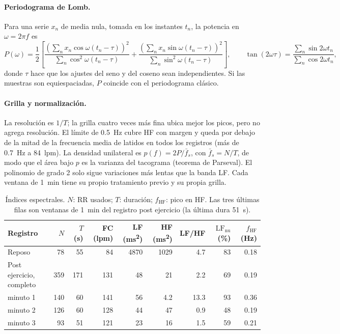 \paragraph{Periodograma de Lomb.}
Para una serie $x_n$ de media nula, tomada en los instantes $t_n$, la potencia en $\omega = 2\pi f$ es
\begin{equation}
  P(\omega) = \frac{1}{2}\left[
    \frac{\left(\sum_n x_n \cos\omega(t_n-\tau)\right)^2}{\sum_n \cos^2\omega(t_n-\tau)} +
    \frac{\left(\sum_n x_n \sin\omega(t_n-\tau)\right)^2}{\sum_n \sin^2\omega(t_n-\tau)}
  \right],
  \qquad
  \tan(2\omega\tau) = \frac{\sum_n \sin 2\omega t_n}{\sum_n \cos 2\omega t_n},
  \label{eq:lomb}
\end{equation}
donde $\tau$ hace que los ajustes del seno y del coseno sean independientes. Si las muestras son equiespaciadas, $P$ coincide con el periodograma clásico.

\paragraph{Grilla y normalización.}
La resolución es $1/T$; la grilla cuatro veces más fina ubica mejor los picos, pero no agrega resolución. El límite de \SI{0.5}{\hertz} cubre HF con margen y queda por debajo de la mitad de la frecuencia media de latidos en todos los registros (más de \SI{0.7}{\hertz} a \SI{84}{lpm}). La densidad unilateral es $p(f) = 2P/\bar f_s$, con $\bar f_s = N/T$, de modo que el área bajo $p$ es la varianza del tacograma (teorema de Parseval). El polinomio de grado 2 solo sigue variaciones más lentas que la banda LF. Cada ventana de \SI{1}{\minute} tiene su propio tratamiento previo y su propia grilla.

\begin{table}[htbp]
  \centering
  \caption{Índices espectrales. $N$: RR usados; $T$: duración; $f_\mathrm{HF}$: pico en HF. Las tres últimas filas son ventanas de \SI{1}{\minute} del registro post ejercicio (la última dura \SI{51}{\second}).}
  \label{tab:lomb}
  \small
  \setlength{\tabcolsep}{4pt}
  \begin{tabular}{@{}lrrrrrrrr@{}}
    \toprule
    Registro & $N$ & $T$ (s) & FC (lpm) & LF (\si{\milli\second\squared}) & HF (\si{\milli\second\squared}) & LF/HF & $\mathrm{LF_{nu}}$ (\%) & $f_\mathrm{HF}$ (Hz) \\
    \midrule
    Reposo                 &  78 &  55 &  84 & 4870 & 1029 & \num{4.7} & 83 & \num{0.18} \\
    Post ejercicio, completo & 359 & 171 & 131 &   48 &   21 & \num{2.2} & 69 & \num{0.19} \\
    \quad minuto 1         & 140 &  60 & 141 &   56 & \num{4.2} & \num{13.3} & 93 & \num{0.36} \\
    \quad minuto 2         & 126 &  60 & 128 &   44 &   47 & \num{0.9} & 48 & \num{0.19} \\
    \quad minuto 3         &  93 &  51 & 121 &   23 &   16 & \num{1.5} & 59 & \num{0.21} \\
    \bottomrule
  \end{tabular}
\end{table}
